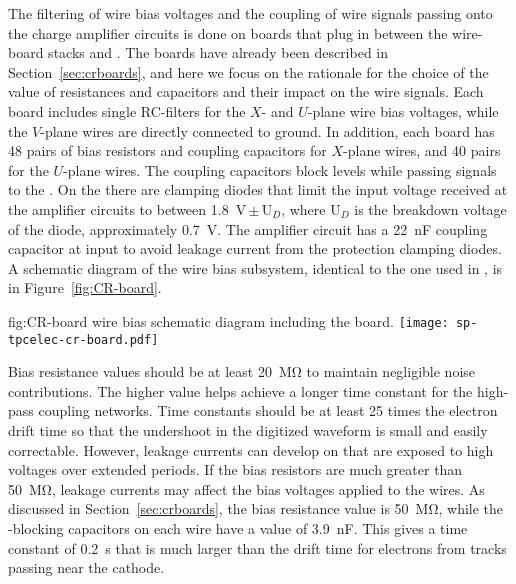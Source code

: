 The filtering of wire bias voltages and the  coupling 
of wire signals passing onto the charge amplifier circuits is 
done on  boards that plug in between the  
wire-board stacks and . The  boards
have already been described in Section~\ref{sec:crboards},
and here we focus on the rationale for the choice of the
value of resistances and capacitors and their impact on the
wire signals. Each  board includes single RC-filters 
for the $X$- and $U$-plane wire bias voltages, while the $V$-plane 
wires are directly connected to ground. In addition, each board 
has \num{48} pairs of bias resistors and  coupling 
capacitors for $X$-plane wires, and \num{40} pairs for the $U$-plane 
wires. The coupling capacitors block  levels while passing  
signals to the . On the  there are clamping
diodes that limit the input voltage received at the amplifier
circuits to between \SI{1.8}{V}\,$\pm$\,U$_D$, where U$_D$
is the breakdown voltage of the diode, approximately \SI{0.7}{V}.
The amplifier circuit has a \SI{22}{nF} coupling capacitor at
input to avoid leakage current from the protection clamping diodes.
A schematic diagram of the   wire bias 
subsystem, identical to the one used in , is 
in Figure~\ref{fig:CR-board}.

\begin{dunefigure}
{fig:CR-board}
{  wire bias schematic diagram including the  board.}
\texttt{[image: sp-tpcelec-cr-board.pdf]}
\end{dunefigure}

Bias resistance values should be at least \SI{20}{\mega\ohm} to 
maintain negligible noise contributions. The higher value helps 
achieve a longer time constant for the high-pass coupling networks.
Time constants should be at least \num{25} times the electron 
drift time so that the undershoot in the digitized waveform
is small and easily correctable. However, leakage currents can 
develop on  that are exposed to high voltages over 
extended periods. If the bias resistors are much greater than 
\SI{50}{\mega\ohm}, leakage currents may affect the bias voltages 
applied to the wires. As discussed in Section~\ref{sec:crboards},
the bias resistance value is \SI{50}{\mega\ohm}, while the 
-blocking capacitors on each wire have a value of
\SI{3.9}{nF}. This gives a time constant of \SI{0.2}{s} that
is much larger than the drift time for electrons from tracks
passing near the cathode.

